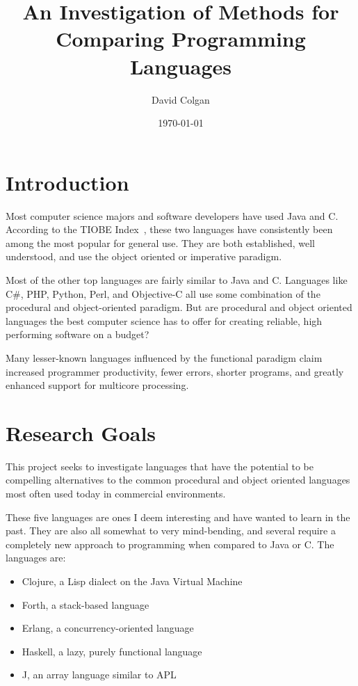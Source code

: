 \documentclass{article}
\title{An Investigation of Methods for Comparing Programming Languages}
\author{David Colgan}
\date{\today}
\begin{document}
\maketitle

\section{Introduction}

Most computer science majors and software developers have used Java and C.
According to the TIOBE Index~\cite{tiobe}, these two languages have
consistently been among the most popular for general use.  They are both
established, well understood, and use the object oriented or imperative
paradigm.

Most of the other top languages are fairly similar to Java and C.  Languages
like C\#, PHP, Python, Perl, and Objective-C all use some combination of the
procedural and object-oriented paradigm.   But are procedural and object
oriented languages the best computer science has to offer for creating
reliable, high performing software on a budget?

Many lesser-known languages influenced by the functional paradigm claim
increased programmer productivity, fewer errors, shorter programs, and greatly
enhanced support for multicore processing.

\section{Research Goals}

This project seeks to investigate languages that have the potential to be
compelling alternatives to the common procedural and object oriented languages
most often used today in commercial environments.

These five languages are ones I deem interesting and have wanted to learn in
the past.  They are also all somewhat to very mind-bending, and several require
a completely new approach to programming when compared to Java or C.  The
languages are:

\begin{itemize}
\item Clojure, a Lisp dialect on the Java Virtual Machine

\item Forth, a stack-based language

\item Erlang, a concurrency-oriented language

\item Haskell, a lazy, purely functional language

\item J, an array language similar to APL
\end{itemize}
\end{document}
